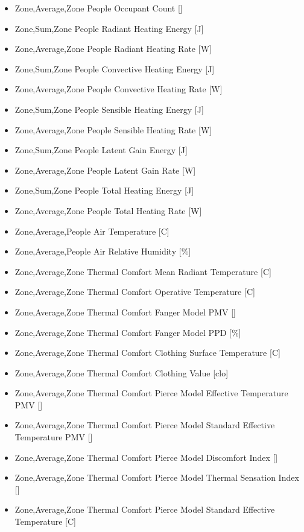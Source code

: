 \begin{itemize}
  Zone,Average,Space People Total Heating Rate {[}W{]}
\item
  Zone,Average,Zone People Occupant Count {[]}
\item
  Zone,Sum,Zone People Radiant Heating Energy {[}J{]}
\item
  Zone,Average,Zone People Radiant Heating Rate {[}W{]}
\item
  Zone,Sum,Zone People Convective Heating Energy {[}J{]}
\item
  Zone,Average,Zone People Convective Heating Rate {[}W{]}
\item
  Zone,Sum,Zone People Sensible Heating Energy {[}J{]}
\item
  Zone,Average,Zone People Sensible Heating Rate {[}W{]}
\item
  Zone,Sum,Zone People Latent Gain Energy {[}J{]}
\item
  Zone,Average,Zone People Latent Gain Rate {[}W{]}
\item
  Zone,Sum,Zone People Total Heating Energy {[}J{]}
\item
  Zone,Average,Zone People Total Heating Rate {[}W{]}
\item
  Zone,Average,People Air Temperature {[}C{]}
\item
  Zone,Average,People Air Relative Humidity {[}\%{]}
\item
  Zone,Average,Zone Thermal Comfort Mean Radiant Temperature {[}C{]}
\item
  Zone,Average,Zone Thermal Comfort Operative Temperature {[}C{]}
\item
  Zone,Average,Zone Thermal Comfort Fanger Model PMV {[]}
\item
  Zone,Average,Zone Thermal Comfort Fanger Model PPD {[}\%{]}
\item
  Zone,Average,Zone Thermal Comfort Clothing Surface Temperature {[}C{]}
\item
  Zone,Average,Zone Thermal Comfort Clothing Value {[}clo{]}
\item
  Zone,Average,Zone Thermal Comfort Pierce Model Effective Temperature PMV {[]}
\item
  Zone,Average,Zone Thermal Comfort Pierce Model Standard Effective Temperature PMV {[]}
\item
  Zone,Average,Zone Thermal Comfort Pierce Model Discomfort Index {[]}
\item
  Zone,Average,Zone Thermal Comfort Pierce Model Thermal Sensation Index {[]}
\item
  Zone,Average,Zone Thermal Comfort Pierce Model Standard Effective Temperature {[C]}

\end{itemize}
